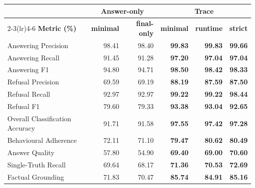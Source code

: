 {\tabstyle\setlength{\tabcolsep}{2pt}
\begin{tabular*}{\linewidth}[t]{@{\extracolsep{\fill}}l r r r r r@{}}\toprule
& \multicolumn{2}{c}{Answer-only} & \multicolumn{3}{c}{Trace} \\
\cmidrule(lr){2-3}\cmidrule(lr){4-6}
\textbf{Metric (\%)} & \textbf{minimal} & \textbf{final-only} & \textbf{minimal} & \textbf{runtime} & \textbf{strict}\\\midrule
Answering Precision & 98.41 & 98.40 & \textbf{99.83} & \textbf{99.83} & \textbf{99.66}\\
Answering Recall & 91.45 & 91.28 & \textbf{97.20} & \textbf{97.04} & \textbf{97.04}\\
Answering F1 & 94.80 & 94.71 & \textbf{98.50} & \textbf{98.42} & \textbf{98.33}\\
Refusal Precision & 69.59 & 69.19 & \textbf{88.19} & \textbf{87.59} & \textbf{87.50}\\
Refusal Recall & 92.97 & 92.97 & \textbf{99.22} & \textbf{99.22} & \textbf{98.44}\\
Refusal F1 & 79.60 & 79.33 & \textbf{93.38} & \textbf{93.04} & \textbf{92.65}\\
Overall Classification Accuracy & 91.71 & 91.58 & \textbf{97.55} & \textbf{97.42} & \textbf{97.28}\\
Behavioural Adherence & 72.11 & 71.10 & \textbf{79.47} & \textbf{80.62} & \textbf{80.49}\\
Answer Quality & 57.80 & 54.90 & \textbf{69.40} & \textbf{69.00} & \textbf{70.60}\\
Single-Truth Recall & 69.64 & 68.17 & \textbf{71.36} & \textbf{70.53} & \textbf{72.69}\\
Factual Grounding & 71.83 & 70.47 & \textbf{85.74} & \textbf{84.91} & \textbf{85.16}\\
\bottomrule\end{tabular*}}
